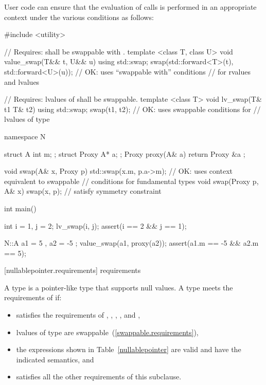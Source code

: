 \enterexample User code can ensure that the evaluation of  calls
is performed in an appropriate context under the various conditions as follows:
\begin{codeblock}
#include <utility>

// Requires:  shall be swappable with .
template <class T, class U>
void value_swap(T&& t, U&& u) {
  using std::swap;
  swap(std::forward<T>(t), std::forward<U>(u)); // OK: uses ``swappable with'' conditions
                                                // for rvalues and lvalues
}

// Requires: lvalues of  shall be swappable.
template <class T>
void lv_swap(T& t1 T& t2) {
  using std::swap;
  swap(t1, t2);                                 // OK: uses swappable conditions for
}                                               // lvalues of type 

namespace N {
  struct A { int m; };
  struct Proxy { A* a; };
  Proxy proxy(A& a) { return Proxy{ &a }; }

  void swap(A& x, Proxy p) {
    std::swap(x.m, p.a->m);                     // OK: uses context equivalent to swappable
                                                // conditions for fundamental types
  }
  void swap(Proxy p, A& x) { swap(x, p); }      // satisfy symmetry constraint
}

int main() {
  int i = 1, j = 2;
  lv_swap(i, j);
  assert(i == 2 && j == 1);

  N::A a1 = { 5 }, a2 = { -5 };
  value_swap(a1, proxy(a2));
  assert(a1.m == -5 && a2.m == 5);
}
\end{codeblock}
\exitexample

[nullablepointer.requirements]{ requirements}

\pnum
A  type is a pointer-like type that supports null values.
A type  meets the requirements of  if:

\begin{itemize}
\item {} satisfies the requirements of ,
, , ,
and ,

\item lvalues of type  are swappable~(\ref{swappable.requirements}),

\item the expressions shown in Table~\ref{nullablepointer} are
valid and have the indicated semantics, and

\item {} satisfies all the other requirements of this subclause.
\end{itemize}

